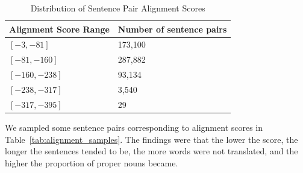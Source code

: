 \newpage

\begin{table}[h]
    \centering
    \begin{tabularx}{.7\textwidth}{ss}\toprule
        Alignment Score Range & Number of sentence pairs \\\midrule
        $[-3, -81]$ & 173,100 \\
        $[-81, -160]$ & 287,882 \\\midrule
        $[-160, -238]$ & 93,134 \\
        $[-238, -317]$ & 3,540 \\
        $[-317, -395]$ & 29 \\
        \bottomrule
    \end{tabularx}
    \caption{Distribution of Sentence Pair Alignment Scores}
    \label{tab:alignment_scores}
\end{table}

We sampled some sentence pairs corresponding to alignment scores in Table~\ref{tab:alignment_samples}. The findings were that the lower the score, the longer the sentences tended to be, the more words were not translated, and the higher the proportion of proper nouns became.

